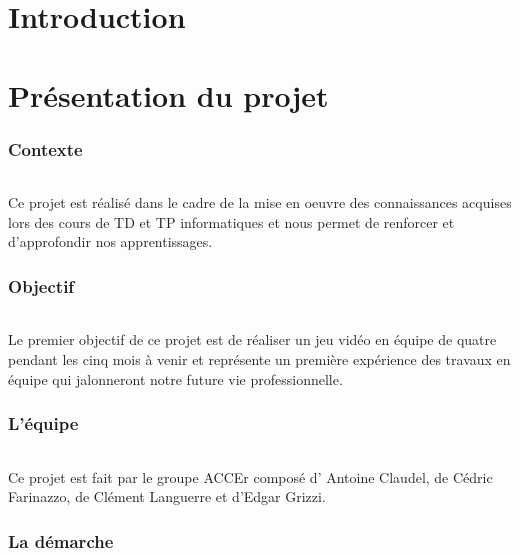 \documentclass[titlepage, 13px, a4paper]{article}
\begin{document}
\AddToShipoutPicture*{\BackgroundPic}

\maketitle
\tableofcontents

\newpage 
\part{Introduction} 


\newpage 
\part{Présentation du projet}  
\section{Contexte} 
\paragraph{} \hspace{0pt} 
Ce projet est réalisé dans le cadre de la mise en oeuvre des connaissances acquises 
lors des cours de TD et TP informatiques et nous permet de renforcer et d’approfondir nos apprentissages.   

\section{Objectif} 
\paragraph{} \hspace{0pt} 
Le  premier  objectif de ce projet est de réaliser un jeu vidéo en équipe de quatre pendant les cinq mois à venir 
et représente un première expérience des travaux en équipe qui jalonneront notre future vie professionnelle. 
\section{L'équipe} 
\paragraph{} \hspace{0pt} 
Ce projet est fait par le groupe ACCEr composé d’ Antoine Claudel, de Cédric Farinazzo, 
de Clément Languerre et d’Edgar Grizzi. 
\section{La démarche} 
\end{document}
